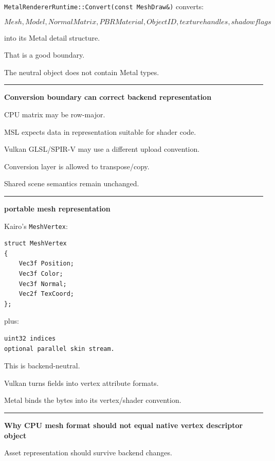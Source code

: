 \texttt{MetalRendererRuntime::Convert(const\ MeshDraw\&)} converts:

\[
Mesh,
Model,
NormalMatrix,
PBRMaterial,
ObjectID,
texture handles,
shadow flags
\]

into its Metal detail structure.

That is a good boundary.

The neutral object does not contain Metal types.

\begin{center}\rule{0.5\linewidth}{0.5pt}\end{center}

\textbf{Conversion boundary can correct backend representation}

CPU matrix may be row-major.

MSL expects data in representation suitable for shader code.

Vulkan GLSL/SPIR-V may use a different upload convention.

Conversion layer is allowed to transpose/copy.

Shared scene semantics remain unchanged.

\begin{center}\rule{0.5\linewidth}{0.5pt}\end{center}

\textbf{portable mesh representation}

Kairo's \texttt{MeshVertex}:

\begin{verbatim}
struct MeshVertex
{
    Vec3f Position;
    Vec3f Color;
    Vec3f Normal;
    Vec2f TexCoord;
};
\end{verbatim}

plus:

\begin{verbatim}
uint32 indices
optional parallel skin stream.
\end{verbatim}

This is backend-neutral.

Vulkan turns fields into vertex attribute formats.

Metal binds the bytes into its vertex/shader convention.

\begin{center}\rule{0.5\linewidth}{0.5pt}\end{center}

\textbf{Why CPU mesh format should not equal native vertex descriptor object}

Asset representation should survive backend changes.

